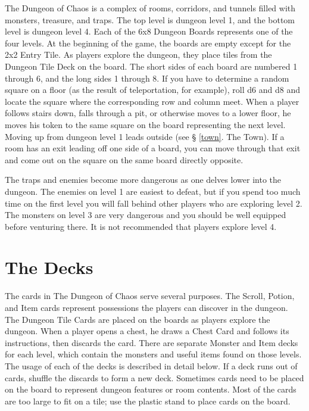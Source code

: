 \documentclass{book}
\begin{document}
The Dungeon of Chaos is a complex of rooms, corridors, and tunnels filled with monsters, treasure, and traps. The top level is dungeon level 1, and the bottom level is dungeon level 4. Each of the 6x8 Dungeon Boards represents one of the four levels. At the beginning of the game, the boards are empty except for the 2x2 Entry Tile. As players explore the dungeon, they place tiles from the Dungeon Tile Deck on the board. The short sides of each board are numbered 1 through 6, and the long sides 1 through 8. If you have to determine a random square on a floor (as the result of teleportation, for example), roll d6 and d8 and locate the square where the corresponding row and column meet. When a player follows stairs down, falls through a pit, or otherwise moves to a lower floor, he moves his token to the same square on the board representing the next level. Moving up from dungeon level 1 leads outside (see § \ref{town}. The Town). If a room has an exit leading off one side of a board, you can move through that exit and come out on the square on the same board directly opposite.

The traps and enemies become more dangerous as one delves lower into the dungeon. The enemies on level 1 are easiest to defeat, but if you spend too much time on the first level you will fall behind other players who are exploring level 2. The monsters on level 3 are very dangerous and you should be well equipped before venturing there. It is not recommended that players explore level 4.  

\section{The Decks}

The cards in The Dungeon of Chaos serve several purposes. The Scroll, Potion, and Item cards represent possessions the players can discover in the dungeon. The Dungeon Tile Cards are placed on the boards as players explore the dungeon. When a player opens a chest, he draws a Chest Card and follows its instructions, then discards the card.  There are separate Monster and Item decks for each level, which contain the monsters and useful items found on those levels. The usage of each of the decks is described in detail below. If a deck runs out of cards, shuffle the discards to form a new deck. Sometimes cards need to be placed on the board to represent dungeon features or room contents. Most of the cards are too large to fit on a tile; use the plastic stand to place cards on the board.
\end{document}
